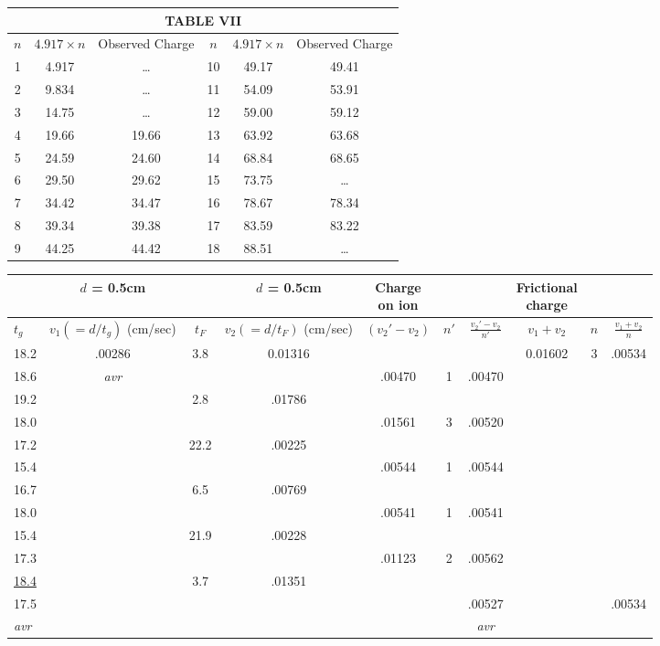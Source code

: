 \documentclass{article}
\begin{document}
\begin{center}
\begin{tabular}{c|c|c|c|c|c}
\hline
\multicolumn{6}{c}{TABLE VII}\\
\hline
$n$ & $4.917\!\times\!{n}$ & Observed Charge & $n$ & $4.917\!\times\!{n}$ & Observed Charge\\
\hline
1 & 4.917 & \ldots & 10 & 49.17 & 49.41\\
2 & 9.834 & \ldots & 11 & 54.09 & 53.91\\
3 & 14.75 & \ldots & 12 & 59.00 & 59.12\\
4 & 19.66 & 19.66  & 13 & 63.92 & 63.68\\
5 & 24.59 & 24.60  & 14 & 68.84 & 68.65\\
6 & 29.50 & 29.62  & 15 & 73.75 & \ldots\\
7 & 34.42 & 34.47  & 16 & 78.67 & 78.34\\
8 & 39.34 & 39.38  & 17 & 83.59 & 83.22\\
9 & 44.25 & 44.42  & 18 & 88.51 & \ldots\\
\hline
\end{tabular}
\end{center}

\bigskip

\begin{center}
\small
\begin{tabular}{|l|c||c|c|c|c|c|c|c|c|}
\hline
 & $d$ = 0.5cm & & $d$ = 0.5cm & \makecell{Charge\\on ion} & & & \makecell{Frictional\\charge} & & \\
\hline
$t_g$ & \makecell{$v_1(=d/t_g)$\\(cm/sec)} & $t_F$ & \makecell{$v_2(=d/t_F)$\\(cm/sec)} & $(v_{2}'\!-\!v_2)$ & $n'$ & $\frac{v_{2}'-v_2}{n'}$ & $v_1+v_2$ & $n$ & $\frac{v_1+v_2}{n}$\\
\hline
18.2    & .00286 & 3.8 & 0.01316 & & & & 0.01602 & 3 & .00534\\
18.6    & \emph{avr}  & & & .00470 & 1 & .00470 & & & \\
19.2    & & 2.8 & .01786 & & & & & & \\
18.0    & & & & .01561 & 3 & .00520 & & & \\
17.2    & & 22.2 & .00225 & & & & & & \\
15.4    & & & & .00544 & 1 & .00544 & & & \\
16.7    & & 6.5 & .00769 & & & & & & \\
18.0    & & & & .00541 & 1 & .00541 & & & \\
15.4    & & 21.9 & .00228 & & & & & & \\
17.3    & & & & .01123 & 2 & .00562 & & & \\
\underline{18.4}    & & 3.7 & .01351 & & & \underline{\hspace{2em}} & & & \underline{\hspace{2em}} \\
17.5 & & & & & & .00527 & & & .00534 \\
\emph{avr} & & & & & & \emph{avr} & & &\\
\hline
\end{tabular}
\end{center}
\end{document}
